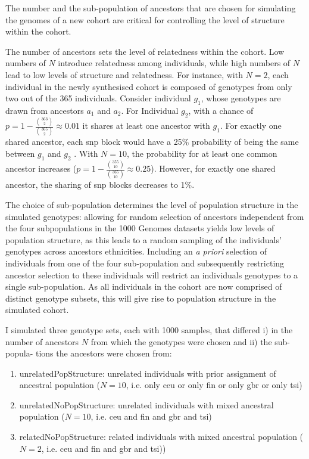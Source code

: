 The number and the sub-population of ancestors that are chosen for simulating the genomes of a new cohort are critical for controlling the level of structure within the cohort. 

The number of ancestors sets the level of relatedness within the cohort. Low numbers of \(N\) introduce relatedness among individuals, while high numbers of \(N\) lead to low levels of structure and relatedness. For instance, with \(N=2\), each individual in the newly synthesised cohort is composed of genotypes from only two out of the \num{365} individuals. Consider individual \(g_1\), whose genotypes are drawn from ancestors \(a_1\) and \(a_2\). For Individual \(g_2\), with a chance of \(p=1- \frac{\binom{363}{2}}{\binom{365}{2}} \approx 0.01\) it shares at least one ancestor with \(g_1\). For exactly one shared ancestor, each \gls{snp} block would have a \num{25}\% probability of being the same between  \(g_1\) and  \(g_2\) . With \(N=10\), the probability for at least one common ancestor increases (\(p=1 - \frac{\binom{355}{10}}{\binom{365}{10}} \approx 0.25\)). However, for exactly one shared ancestor, the sharing of \gls{snp} blocks decreases to \num{1}\%. 

The choice of sub-population determines the level of population structure in the simulated genotypes: allowing for random selection of ancestors independent from the four subpopulations in the 1000 Genomes datasets yields low levels of population structure, as this leads to a random sampling of the individuals' genotypes across ancestors ethnicities. Including an \textit{a priori} selection of individuals from one of the four sub-population and subsequently restricting ancestor selection to these individuals will restrict an individuals genotypes to a single sub-population.  As all individuals in the cohort are now comprised of distinct genotype subsets, this will give rise to population structure in the simulated cohort. 

I simulated three genotype sets, each with \num{1000} samples, that differed i) in the number of ancestors \(N\) from which the genotypes were chosen and ii) the sub-popula- tions the ancestors were chosen from:
\begin{enumerate}[label=\Alph*.]
\item unrelatedPopStructure: unrelated individuals with prior assignment of ancestral population  (\(N=10\), i.e. only \gls{ceu} or only \gls{fin} or only \gls{gbr} or only \gls{tsi})
\item unrelatedNoPopStructure: unrelated individuals with mixed ancestral population  (\(N=10\), i.e. \gls{ceu} and \gls{fin} and  \gls{gbr} and \gls{tsi})
\item relatedNoPopStructure: related individuals with mixed ancestral population (\(N=2\), i.e. \gls{ceu} and \gls{fin} and  \gls{gbr} and \gls{tsi}))
\end{enumerate}



